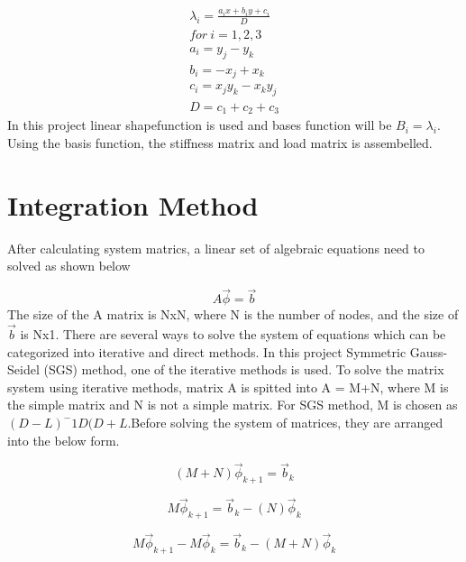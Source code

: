 \documentclass[12pt]{elsarticle}
\begin{document}
	\begin{equation}
		\begin{gathered}
			\lambda_i=\frac{a_ix+b_iy+c_i}{D}\\
			for\ i=1,2,3\\
			a_i=y_j-y_k\\
			b_i=-x_j+x_k\\
			c_i=x_jy_k-x_ky_j\\
			D=c_1+c_2+c_3
		\end{gathered}
	\end{equation}
	In this project linear shapefunction is used and bases function will be $B_i=\lambda_i$. Using the basis function, the stiffness matrix and load matrix is assembelled.
	
	\section{Integration Method}
	After calculating system matrics, a linear set of algebraic equations need to solved as shown below
	
	\begin{equation}
		A \overrightarrow \phi = \overrightarrow b 
	\end{equation}\newline
	The size of the A matrix is NxN, where N is the number of nodes, and the size of  $ \overrightarrow b $ is Nx1. There are several ways to solve the system of equations which can be categorized into iterative and direct methods. In this project Symmetric Gauss-Seidel (SGS) method, one of the iterative methods is used.\newline
	\newline
	To solve the matrix system using iterative methods, matrix A is spitted into A = M+N, where M is the simple matrix and N is not a simple matrix. For SGS method, M is chosen as $(D-L)^-1D(D+L$.Before solving the system of matrices, they are arranged into the below form.
	
	\begin{equation}
		(M+N) {\overrightarrow \phi }_{k+1} = {\overrightarrow b}_{k} 
	\end{equation}
	
	\begin{equation}
		M {\overrightarrow \phi }_{k+1} = {\overrightarrow b}_{k} -(N) {\overrightarrow \phi }_k 
	\end{equation}
	
	\begin{equation}
		M {\overrightarrow \phi }_{k+1}- M {\overrightarrow \phi }_{k} = {\overrightarrow b}_{k} - (M+N) {\overrightarrow \phi }_{k} 
	\end{equation}
	
\end{document}
